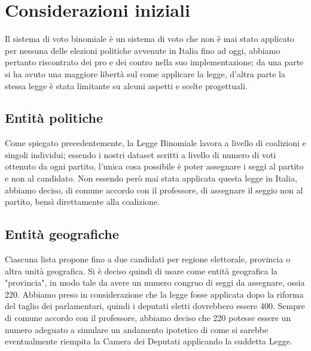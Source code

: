 \documentclass{article}
\begin{document}

\section{Considerazioni iniziali}
Il sistema di voto binomiale è un sistema di voto che non è mai stato applicato per nessuna delle elezioni politiche avvenute in Italia fino ad oggi, abbiamo pertanto riscontrato dei pro e dei contro nella suo implementazione; da una parte si ha avuto una maggiore libertà sul come applicare la legge, d’altra parte la stessa legge è stata limitante su alcuni aspetti e scelte progettuali.


\subsection{Entità politiche}
Come spiegato precedentemente, la Legge Binomiale lavora a livello di coalizioni e singoli individui; essendo i nostri dataset scritti a livello di numero di voti ottenuto da ogni partito, l'unica cosa possibile è poter assegnare i seggi al partito e non al candidato. Non essendo però mai stata applicata questa legge in Italia, abbiamo deciso, di comune accordo con il professore, di assegnare il seggio non al partito, bensì direttamente alla coalizione.

\subsection{Entità geografiche}
Ciascuna lista propone fino a due candidati per regione elettorale, provincia o altra unità geografica. Si è deciso quindi di usare come entità geografica la "provincia", in modo tale da avere un numero congruo di seggi da assegnare, ossia 220. Abbiamo preso in considerazione che la legge fosse applicata dopo la riforma del taglio dei parlamentari, quindi i deputati eletti dovrebbero essere 400. Sempre di comune accordo con il professore, abbiamo deciso che 220 potesse essere un numero adeguato a simulare un andamento ipotetico di come si sarebbe eventualmente riempita la Camera dei Deputati applicando la suddetta Legge.


\end{document}
